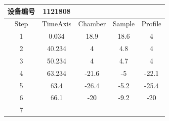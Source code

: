 \documentclass[UTF8,10pt,a4paper,fontset=fandol]{ctexart}
\newcommand{\fieldvalue}[1]{#1}
\begin{document}
\begin{center}
\begin{tabular}{|c|c|c|c|c|}
\hline
设备编号 &
\fieldvalue{1121808}
& & &\\
\hline
Step & TimeAxis & Chamber & Sample & Profile\\
\hline
1 &
\fieldvalue{0.034} &
\fieldvalue{18.9} &
\fieldvalue{18.6} &
\fieldvalue{4}\\
\hline
2 &
\fieldvalue{40.234} &
\fieldvalue{4} &
\fieldvalue{4.8} &
\fieldvalue{4}\\
\hline
3 &
\fieldvalue{50.234} &
\fieldvalue{4} &
\fieldvalue{4.7} &
\fieldvalue{4}\\
\hline
4 &
\fieldvalue{63.234} &
\fieldvalue{-21.6} &
\fieldvalue{-5} &
\fieldvalue{-22.1}\\
\hline
5 &
\fieldvalue{63.4} &
\fieldvalue{-26.4} &
\fieldvalue{-5.2} &
\fieldvalue{-25.4}\\
\hline
6 &
\fieldvalue{66.1} &
\fieldvalue{-20} &
\fieldvalue{-9.2} &
\fieldvalue{-20}\\
\hline
7 &

\end{tabular}
\end{center}
\end{document}
